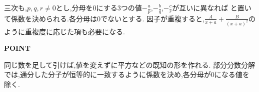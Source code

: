 三次も,$p,q,r\ne0$とし,分母を0にする3つの値$-\frac{a}{p}$,$-\frac{b}{q}$,$-\frac{c}{r}$が互いに異なれば
\BookMathLayout{\[
    \frac1{(px+a)(qx+b)(rx+c)}
    =\frac\alpha{px+a}+\frac\beta{qx+b}+\frac\gamma{rx+c}
  \]}{
  \[
    \begin{aligned}
      \frac1{(px+a)(qx+b)(rx+c)}
      &=\frac\alpha{px+a}+\frac\beta{qx+b}\\
      &\quad+\frac\gamma{rx+c}
    \end{aligned}
  \]
}
と置いて係数を決められる.各分母は0でないとする.
因子が重複すると,$\frac{A}{x+a}+\frac{B}{(x+a)^2}$のように重複度に応じた項も必要になる.

\begin{bookpoint}
  \textbf{POINT}\par
  同じ数を足して引けば,値を変えずに平方などの既知の形を作れる.
  部分分数分解では,通分した分子が恒等的に一致するように係数を決め,各分母が0になる値を除く.
\end{bookpoint}
